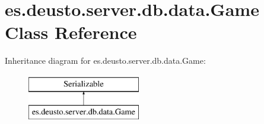 \hypertarget{classes_1_1deusto_1_1server_1_1db_1_1data_1_1_game}{}\section{es.\+deusto.\+server.\+db.\+data.\+Game Class Reference}
\label{classes_1_1deusto_1_1server_1_1db_1_1data_1_1_game}
Inheritance diagram for es.\+deusto.\+server.\+db.\+data.\+Game\+:\begin{figure}[H]
\begin{center}
\leavevmode
\includegraphics[height=2.000000cm]{classes_1_1deusto_1_1server_1_1db_1_1data_1_1_game}
\end{center}
\end{figure}
